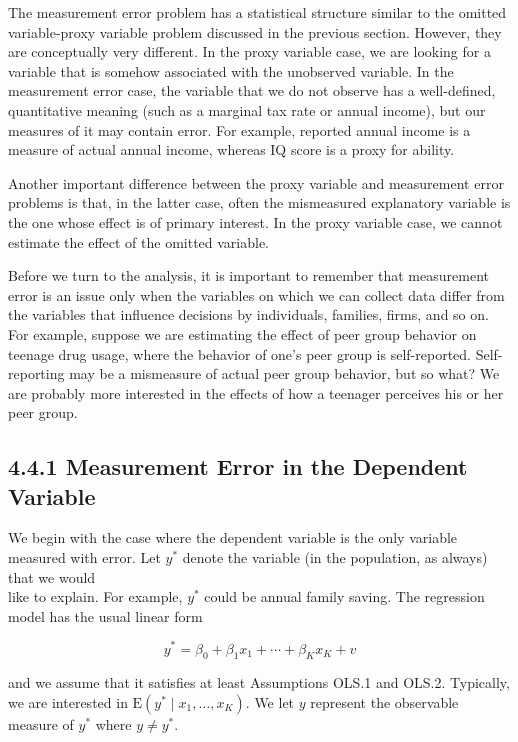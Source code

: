 \documentclass[10pt]{article}
\begin{document}
The measurement error problem has a statistical structure similar to the omitted variable-proxy variable problem discussed in the previous section. However, they are conceptually very different. In the proxy variable case, we are looking for a variable that is somehow associated with the unobserved variable. In the measurement error case, the variable that we do not observe has a well-defined, quantitative meaning (such as a marginal tax rate or annual income), but our measures of it may contain error. For example, reported annual income is a measure of actual annual income, whereas IQ score is a proxy for ability.

Another important difference between the proxy variable and measurement error problems is that, in the latter case, often the mismeasured explanatory variable is the one whose effect is of primary interest. In the proxy variable case, we cannot estimate the effect of the omitted variable.

Before we turn to the analysis, it is important to remember that measurement error is an issue only when the variables on which we can collect data differ from the variables that influence decisions by individuals, families, firms, and so on. For example, suppose we are estimating the effect of peer group behavior on teenage drug usage, where the behavior of one's peer group is self-reported. Self-reporting may be a mismeasure of actual peer group behavior, but so what? We are probably more interested in the effects of how a teenager perceives his or her peer group.

\subsection*{4.4.1 Measurement Error in the Dependent Variable}
We begin with the case where the dependent variable is the only variable measured with error. Let $y^{*}$ denote the variable (in the population, as always) that we would\\
like to explain. For example, $y^{*}$ could be annual family saving. The regression model has the usual linear form


\begin{equation*}
y^{*}=\beta_{0}+\beta_{1} x_{1}+\cdots+\beta_{K} x_{K}+v \tag{4.37}
\end{equation*}


and we assume that it satisfies at least Assumptions OLS.1 and OLS.2. Typically, we are interested in $\mathrm{E}\left(y^{*} \mid x_{1}, \ldots, x_{K}\right)$. We let $y$ represent the observable measure of $y^{*}$ where $y \neq y^{*}$.
\end{document}
